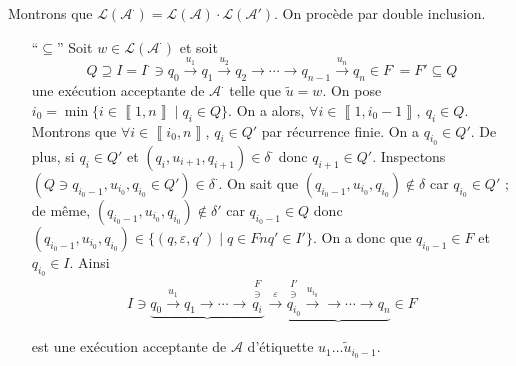 \begin{prv}
	Montrons que $\mathcal{L}(\mathcal{A}^\cdot) = \mathcal{L}(\mathcal{A}) \cdot \mathcal{L}(\mathcal{A}')$. On procède par double inclusion.
	\begin{itemize}
		\item[``$\subseteq$''] Soit $w \in \mathcal{L}(\mathcal{A}^\cdot)$\/ et soit \[
				Q \supseteq I = I^\cdot \ni q_0 \xrightarrow{u_1} q_1 \xrightarrow{u_2} q_2 \to \cdots \to q_{n-1} \xrightarrow{u_n} q_n \in F^\cdot = F' \subseteq Q
			\]  une exécution acceptante de $\mathcal{A}^\cdot$\/ telle que $\tilde u = w$. On pose $i_0 = \min \{ i \in \left\llbracket 1,n \right\rrbracket  \mid q_i \in Q\}$. On a alors, $\forall i \in \left\llbracket 1,i_0-1 \right\rrbracket,\:q_i \in Q$. Montrons que $\forall i \in \left\llbracket i_0,n \right\rrbracket$, $q_i \in Q'$\/ par récurrence finie. On a $q_{i_0} \in Q'$. De plus, si $q_i \in Q'$\/ et $(q_i, u_{i + 1}, q_{i+1}) \in \delta^\cdot$\/ donc $q_{i+1} \in Q'$.
			Inspectons $(Q \ni q_{i_0-1}, u_{i_0}, q_{i_0} \in Q') \in \delta^\cdot$. On sait que $(q_{i_0 - 1}, u_{i_0}, q_{i_0}) \not\in \delta$\/ car $q_{i_0} \in Q'$\/ ; de même, $(q_{i_0 - 1}, u_{i_0}, q_{i_0}) \not\in \delta'$\/ car $q_{i_0- 1} \in Q$\/ donc $(q_{i_0-1},u_{i_0}, q_{i_0}) \in \{(q,\varepsilon,q')  \mid q \in Fn q' \in I'\}$. On a donc que $q_{i_0-1} \in F$\/ et $q_{i_0} \in I$. Ainsi \[
				I \ni \underbrace{q_0 \xrightarrow{u_1} q_1 \to \cdots \to \overset{\substack{F\\\ni}}{q_{i}}} \xrightarrow\varepsilon \underbrace{\overset{\substack{I'\\\ni}}{q_{i_0}} \xrightarrow{u_{i_0}} \to \cdots \to q_n} \in F
			\]
			\begin{multicols}{2}
				est une exécution acceptante de $\mathcal{A}$\/ d'étiquette $\widetilde{u_1\ldots u_{i_0-1}}$.


\end{multicols}
\end{itemize}
\end{prv}
